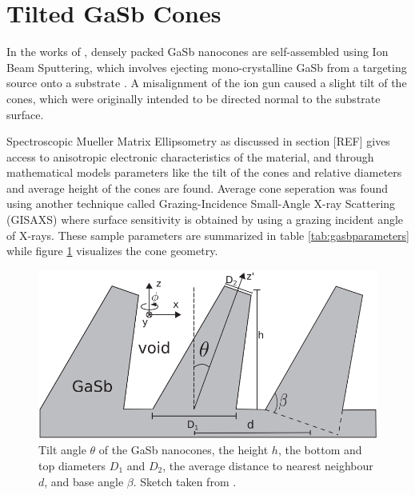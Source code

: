 \section{Tilted GaSb Cones}


In the works of \cite{gasbcones}, densely packed GaSb nanocones are self-assembled using Ion Beam Sputtering, which involves ejecting mono-crystalline GaSb from a targeting source onto a substrate . A misalignment of the ion gun caused a slight tilt of the cones, which were originally intended to be directed normal to the substrate surface.

Spectroscopic Mueller Matrix Ellipsometry as discussed in section [REF] gives access to anisotropic electronic characteristics of the material, and through mathematical models parameters like the tilt of the cones and relative diameters and average height of the cones are found\cite{gasbcones}. Average cone seperation was found using another technique called Grazing-Incidence Small-Angle X-ray Scattering (GISAXS) where surface sensitivity is obtained by using a grazing incident angle of X-rays. These sample parameters are summarized in table \ref{tab:gasbparameters} while figure \ref{fig:GaSbConeGeometry} visualizes the cone geometry. 

\begin{figure}
    \centering
    \includegraphics[scale=0.33]{figures/Ch3/GaSbConesGeometry.png}
    \caption{Tilt angle $\theta$ of the GaSb nanocones, the height $h$, the bottom and top diameters $D_1$ and $D_2$, the average distance to nearest neighbour $d$, and base angle $\beta$. Sketch taken from \cite{gasbcones}.}    
    \label{fig:GaSbConeGeometry}
\end{figure}



